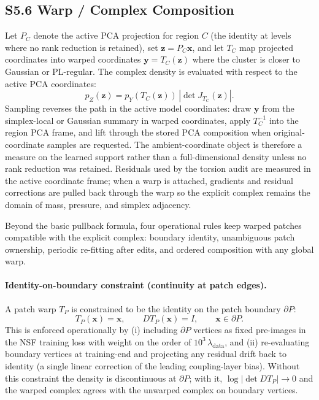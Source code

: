 \documentclass[11pt]{article}
\begin{document}
\subsection*{S5.6 Warp / Complex Composition}
Let $P_C$ denote the active PCA projection for region $C$ (the identity at levels where no rank reduction is retained), set $\mathbf z=P_C\mathbf x$, and let $T_C$ map projected coordinates into warped coordinates $\mathbf y=T_C(\mathbf z)$ where the cluster is closer to Gaussian or PL-regular. The complex density is evaluated with respect to the active PCA coordinates:
\[
p_Z(\mathbf z)=p_Y(T_C(\mathbf z))\,\left|\det J_{T_C}(\mathbf z)\right|.
\]
Sampling reverses the path in the active model coordinates: draw $\mathbf y$ from the simplex-local or Gaussian summary in warped coordinates, apply $T_C^{-1}$ into the region PCA frame, and lift through the stored PCA composition when original-coordinate samples are requested. The ambient-coordinate object is therefore a measure on the learned support rather than a full-dimensional density unless no rank reduction was retained. Residuals used by the torsion audit are measured in the active coordinate frame; when a warp is attached, gradients and residual corrections are pulled back through the warp so the explicit complex remains the domain of mass, pressure, and simplex adjacency.

Beyond the basic pullback formula, four operational rules keep warped patches compatible with the explicit complex: boundary identity, unambiguous patch ownership, periodic re-fitting after edits, and ordered composition with any global warp.

\paragraph{Identity-on-boundary constraint (continuity at patch edges).}
A patch warp $T_P$ is constrained to be the identity on the patch boundary $\partial P$:
\[
T_P(\mathbf x)=\mathbf x,\qquad
DT_P(\mathbf x)=I,
\qquad \mathbf x\in\partial P.
\]
This is enforced operationally by (i) including $\partial P$ vertices as fixed pre-images in the NSF training loss with weight on the order of $10^3\,\lambda_{\mathrm{data}}$, and (ii) re-evaluating boundary vertices at training-end and projecting any residual drift back to identity (a single linear correction of the leading coupling-layer bias). Without this constraint the density is discontinuous at $\partial P$; with it, $\log|\det DT_P|\to 0$ and the warped complex agrees with the unwarped complex on boundary vertices.
\end{document}
